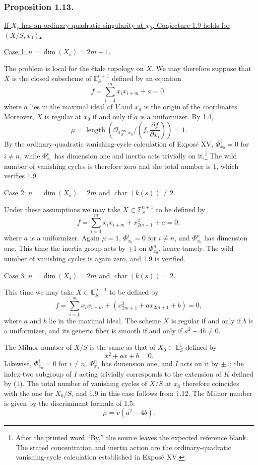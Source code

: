 \subsubsection*{Proposition 1.13.}
\underline{If $X_s$ has an ordinary quadratic singularity at $x_0$,
Conjecture 1.9 holds for $(X/S,x_0)$.}

\medskip
\noindent\underline{Case 1: $n=\dim(X_s)=2m-1$.}

The problem is local for the \'etale topology on $X$.  We may
therefore suppose that $X$ is the closed subscheme of
$\mathbb E_S^{n+1}$ defined by an equation
\[
f=\sum_{i=1}^{m}x_i x_{i+m}+a=0,
\]
where $a$ lies in the maximal ideal of $V$ and $x_0$ is the origin
of the coordinates.  Moreover, $X$ is regular at $x_0$ if and only
if $a$ is a uniformizer.  By 1.4,
\[
\mu=\operatorname{length}\!\left(
\mathcal O_{\mathbb E_S^{2m},x_0}/
\left(f,\frac{\partial f}{\partial x_i}\right)\right)=1.
\]
By the ordinary-quadratic vanishing-cycle calculation of Expos\'e XV,
$\Phi^i_{x_0}=0$ for $i\ne n$, while $\Phi^n_{x_0}$ has dimension
one and inertia acts trivially on it.\footnote{After the printed word
``By,'' the source leaves the expected reference blank.  The stated
concentration and inertia action are the ordinary-quadratic
vanishing-cycle calculation established in Expos\'e XV.}
The wild number of vanishing cycles is therefore zero and the total
number is $1$, which verifies 1.9.

\medskip
\noindent\underline{Case 2: $n=\dim(X_s)=2m$ and
$\operatorname{char}(k(s))\ne2$.}

Under these assumptions we may take $X\subset\mathbb E_S^{n+1}$ to
be defined by
\[
f=\sum_{i=1}^{m}x_i x_{i+m}+x_{2m+1}^2+a=0,
\]
where $a$ is a uniformizer.  Again $\mu=1$,
$\Phi^i_{x_0}=0$ for $i\ne n$, and $\Phi^n_{x_0}$ has dimension
one.  This time the inertia group acts by $\pm1$ on
$\Phi^n_{x_0}$, hence tamely.  The wild number of vanishing cycles is
again zero, and 1.9 is verified.

\medskip
\noindent\underline{Case 3: $n=\dim(X_s)=2m$ and
$\operatorname{char}(k(s))=2$.}

This time we may take $X\subset\mathbb E_S^{n+1}$ to be defined by
\[
f=\sum_{i=1}^{m}x_i x_{i+m}
 +(x_{2m+1}^2+a x_{2m+1}+b)=0,
\]
where $a$ and $b$ lie in the maximal ideal.  The scheme $X$ is
regular if and only if $b$ is a uniformizer, and its generic fiber
is smooth if and only if $a^2-4b\ne0$.

The Milnor number of $X/S$ is the same as that of
$X_0\subset\mathbb E_S^1$ defined by
\begin{equation}\tag{1}
x^2+a x+b=0.
\end{equation}
Likewise, $\Phi^i_{x_0}=0$ for $i\ne n$,
$\Phi^n_{x_0}$ has dimension one, and $I$ acts on it by $\pm1$; the
index-two subgroup of $I$ acting trivially corresponds to the
extension of $K$ defined by (1).  The total number of vanishing
cycles of $X/S$ at $x_0$ therefore coincides with the one for
$X_0/S$, and 1.9 in this case follows from 1.12.  The Milnor number
is given by the discriminant formula of 1.5:
\begin{equation}\tag{1.13.1}
\mu=v(a^2-4b).
\end{equation}
